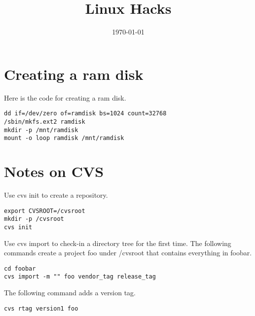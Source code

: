 \documentclass[11pt]{article}
\title{Linux Hacks}
\date{\today}
\begin{document}
\maketitle

\newpage

\tableofcontents

\newpage

\section{Creating a ram disk}
Here is the code for creating a ram disk.

\begin{verbatim}
dd if=/dev/zero of=ramdisk bs=1024 count=32768
/sbin/mkfs.ext2 ramdisk
mkdir -p /mnt/ramdisk
mount -o loop ramdisk /mnt/ramdisk
\end{verbatim}

\section{Notes on CVS}
Use cvs init to create a repository.

\begin{verbatim}
export CVSROOT=/cvsroot
mkdir -p /cvsroot
cvs init
\end{verbatim}

\noindent
Use cvs import to check-in a directory tree for the first time.
The following commands create a project foo under /cvsroot that
contains everything in foobar.

\begin{verbatim}
cd foobar
cvs import -m "" foo vendor_tag release_tag
\end{verbatim}

\noindent
The following command adds a version tag.

\begin{verbatim}
cvs rtag version1 foo
\end{verbatim}
\end{document}
